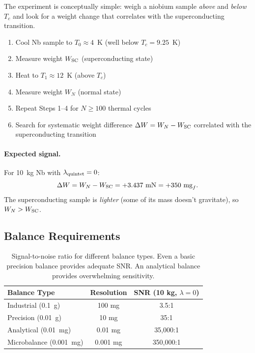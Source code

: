 \documentclass[12pt,a4paper]{article}
\theoremstyle{definition}
\theoremstyle{remark}
\begin{document}
The experiment is conceptually simple: weigh a niobium sample \emph{above} and
\emph{below} $T_c$ and look for a weight change that correlates with the
superconducting transition.

\begin{tcolorbox}[title={Experimental Protocol}]
\begin{enumerate}
\item Cool Nb sample to $T_0 \approx 4$~K (well below $T_c = 9.25$~K)
\item Measure weight $W_{\rm SC}$ (superconducting state)
\item Heat to $T_1 \approx 12$~K (above $T_c$)
\item Measure weight $W_N$ (normal state)
\item Repeat Steps 1--4 for $N \geq 100$ thermal cycles
\item Search for systematic weight difference $\Delta W = W_N - W_{\rm SC}$
correlated with the superconducting transition
\end{enumerate}
\end{tcolorbox}

\paragraph{Expected signal.}
For 10~kg Nb with $\lambda_{\rm quintet} = 0$:
\begin{equation}
\Delta W = W_N - W_{\rm SC} = +3.437~\text{mN} = +350~\text{mg}_f.
\end{equation}
The superconducting sample is \emph{lighter} (some of its mass doesn't gravitate),
so $W_N > W_{\rm SC}$.

\subsection{Balance Requirements}

\begin{table}[h]
\centering
\renewcommand{\arraystretch}{1.3}
\begin{tabular}{lcc}
\toprule
\textbf{Balance Type} & \textbf{Resolution} & \textbf{SNR (10 kg, $\lambda=0$)} \\
\midrule
Industrial (0.1~g) & 100 mg & 3.5:1 \\
Precision (0.01~g) & 10 mg & 35:1 \\
Analytical (0.01~mg) & 0.01 mg & 35,000:1 \\
Microbalance (0.001~mg) & 0.001 mg & 350,000:1 \\
\bottomrule
\end{tabular}
\caption{Signal-to-noise ratio for different balance types.  Even a basic
precision balance provides adequate SNR.  An analytical balance provides
overwhelming sensitivity.}
\label{tab:balance}
\end{table}
\end{document}
